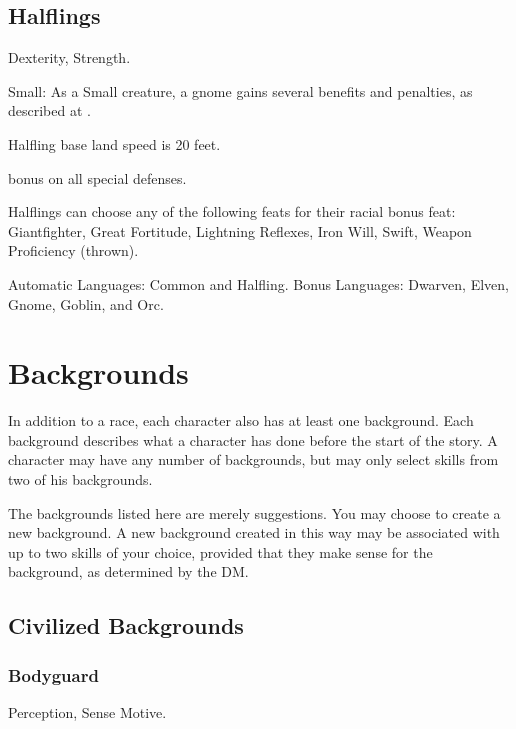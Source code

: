\subsection{Halflings}
\begin{itemize*}
\item {} Dexterity,  Strength.
\item Small: As a Small creature, a gnome gains several benefits and penalties, as described at .
\item Halfling base land speed is 20 feet.
\item {} bonus on all special defenses.
\item Halflings can choose any of the following feats for their racial bonus feat: Giantfighter, Great Fortitude, Lightning Reflexes, Iron Will, Swift, Weapon Proficiency (thrown).
\item Automatic Languages: Common and Halfling. Bonus Languages: Dwarven, Elven, Gnome, Goblin, and Orc.
\end{itemize*}

\section{Backgrounds}
In addition to a race, each character also has at least one background. Each background describes what a character has done before the start of the story. A character may have any number of backgrounds, but may only select skills from two of his backgrounds.

The backgrounds listed here are merely suggestions. You may choose to create a new background. A new background created in this way may be associated with up to two skills of your choice, provided that they make sense for the background, as determined by the DM.


\subsection{Civilized Backgrounds}

\subsubsection{Bodyguard}
 Perception, Sense Motive.

